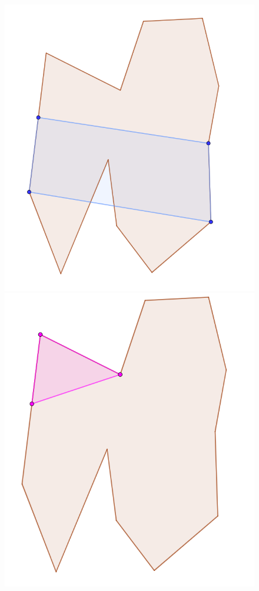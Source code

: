 \documentclass[12pt]{article}
\begin{document}
\begin{figure}[H]
  \caption{}
  \label{fig:intersectionPolygonSection2}
\endminipage\hfill
{}
  \includegraphics[width=\linewidth]{Images/intersection_yMonotoneSection3.png}
  \caption{}
  \label{fig:intersectionPolygonSection3}
\endminipage\hfill
{}
  \includegraphics[width=\linewidth]{Images/intersection_yMonotoneSection4.png}

\end{figure}
\end{document}
